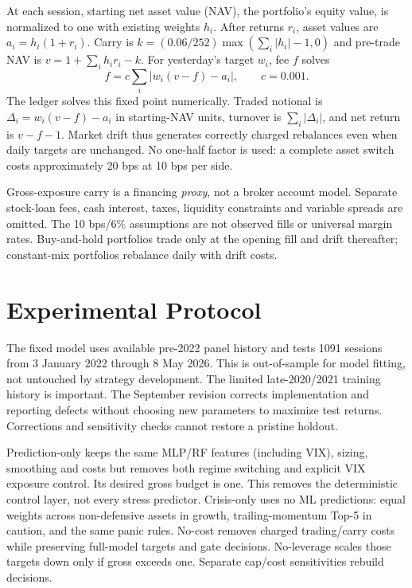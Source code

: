 \documentclass[3p,times]{elsarticle}
\begin{document}
At each session, starting net asset value (NAV), the portfolio's equity value, is normalized to one with existing weights $h_i$. After returns $r_i$, asset values are $a_i=h_i(1+r_i)$. Carry is $k=(0.06/252)\max(\sum_i|h_i|-1,0)$ and pre-trade NAV is $v=1+\sum_i h_ir_i-k$. For yesterday's target $w_i$, fee $f$ solves
\begin{equation}f=c\sum_i|w_i(v-f)-a_i|,\qquad c=0.001.\end{equation}
The ledger solves this fixed point numerically. Traded notional is $\Delta_i=w_i(v-f)-a_i$ in starting-NAV units, turnover is $\sum_i|\Delta_i|$, and net return is $v-f-1$. Market drift thus generates correctly charged rebalances even when daily targets are unchanged. No one-half factor is used: a complete asset switch costs approximately 20 bps at 10 bps per side.

Gross-exposure carry is a financing \emph{proxy}, not a broker account model. Separate stock-loan fees, cash interest, taxes, liquidity constraints and variable spreads are omitted. The 10 bps/6\% assumptions are not observed fills or universal margin rates. Buy-and-hold portfolios trade only at the opening fill and drift thereafter; constant-mix portfolios rebalance daily with drift costs.
\FloatBarrier

\section{Experimental Protocol}
The fixed model uses available pre-2022 panel history and tests 1091 sessions from 3 January 2022 through 8 May 2026. This is out-of-sample for model fitting, not untouched by strategy development. The limited late-2020/2021 training history is important. The September revision corrects implementation and reporting defects without choosing new parameters to maximize test returns. Corrections and sensitivity checks cannot restore a pristine holdout.

Prediction-only keeps the same MLP/RF features (including VIX), sizing, smoothing and costs but removes both regime switching and explicit VIX exposure control. Its desired gross budget is one. This removes the deterministic control layer, not every stress predictor. Crisis-only uses no ML predictions: equal weights across non-defensive assets in growth, trailing-momentum Top-5 in caution, and the same panic rules. No-cost removes charged trading/carry costs while preserving full-model targets and gate decisions. No-leverage scales those targets down only if gross exceeds one. Separate cap/cost sensitivities rebuild decisions.
\end{document}
